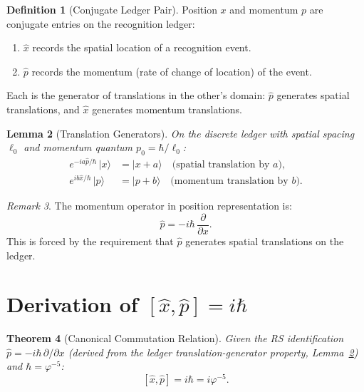 \documentclass[12pt,a4paper]{article}
\newtheorem{theorem}{Theorem}[section]
\newtheorem{lemma}[theorem]{Lemma}
\theoremstyle{definition}
\newtheorem{definition}[theorem]{Definition}
\theoremstyle{remark}
\newtheorem{remark}[theorem]{Remark}
\begin{document}
\begin{definition}[Conjugate Ledger Pair]
\label{def:conjugate}
Position $x$ and momentum $p$ are conjugate entries on the
recognition ledger:
\begin{enumerate}[label=(\roman*),nosep]
  \item $\hat{x}$ records the spatial location of a recognition
  event.
  \item $\hat{p}$ records the momentum (rate of change of
  location) of the event.
\end{enumerate}
Each is the generator of translations in the other's domain:
$\hat{p}$ generates spatial translations, and $\hat{x}$ generates
momentum translations.
\end{definition}

\begin{lemma}[Translation Generators]
\label{lem:translation}
On the discrete ledger with spatial spacing $\ell_0$ and
momentum quantum $p_0 = \hbar/\ell_0$:
\begin{align}
  e^{-ia\hat{p}/\hbar}\,|x\rangle &= |x + a\rangle
  \quad \text{(spatial translation by $a$)}, \\
  e^{ib\hat{x}/\hbar}\,|p\rangle &= |p + b\rangle
  \quad \text{(momentum translation by $b$)}.
\end{align}
\end{lemma}

\begin{remark}
The momentum operator in position representation is:
\begin{equation}
  \hat{p} = -i\hbar\,\frac{\partial}{\partial x}.
\end{equation}
This is forced by the requirement that $\hat{p}$ generates
spatial translations on the ledger.
\end{remark}

\section{Derivation of $[\hat{x}, \hat{p}] = i\hbar$}
\label{sec:derivation}

\begin{theorem}[Canonical Commutation Relation]
\label{thm:ccr}
Given the RS identification $\hat{p} = -i\hbar\,\partial/\partial x$
(derived from the ledger translation-generator property,
Lemma~\ref{lem:translation}) and $\hbar = \varphi^{-5}$:
\begin{equation}
  \boxed{[\hat{x}, \hat{p}] = i\hbar = i\varphi^{-5}.}
\end{equation}
\end{theorem}
\end{document}
